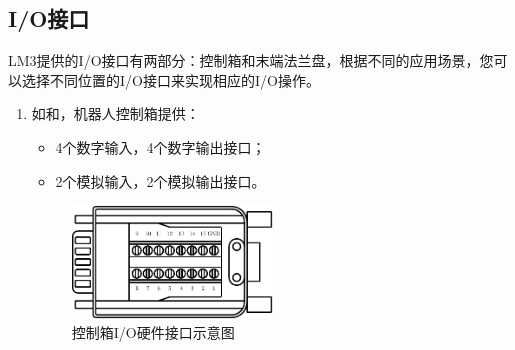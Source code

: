 \clearpage

\subsection{I/O接口}

LM3提供的I/O接口有两部分：控制箱和末端法兰盘，根据不同的应用场景，您可以选择不同位置的I/O接口来实现相应的I/O操作。

\begin{enumerate}
    \item 如和，机器人控制箱提供：
    \begin{itemize}
        \item 4个数字输入，4个数字输出接口；
        \item 2个模拟输入，2个模拟输出接口。
    \end{itemize}

\begin{figure}[ht]
    \centering
    \includegraphics[height=3cm]{line_graphs/robot_box_io_plugin.pdf}
    \caption{控制箱I/O硬件接口示意图}
    \label{fig:控制箱IO}
\end{figure}


\end{enumerate}
